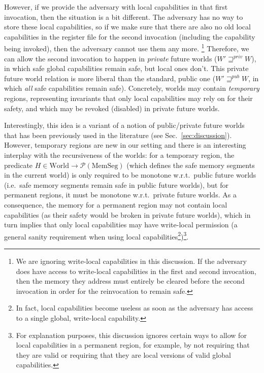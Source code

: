 \documentclass{llncs}
\newcommand{\sectionname}{Sec.}
\newcommand{\powerset}[1]{\mathcal{P}(#1)}
\newcommand{\var}[1]{\mathit{#1}}
\newcommand{\futurewk}{\mathbin{\sqsupseteq}^{\var{pub}}}
\newcommand{\futurestr}{\mathbin{\sqsupseteq}^{\var{priv}}}
\newcommand{\plaindom}[1]{\mathrm{#1}}
\newcommand{\HeapSegments}{\plaindom{MemSeg}}
\newcommand{\MemSegments}{\HeapSegments}
\newcommand{\Worlds}{\plaindom{World}}
\begin{document}
However, if we provide the adversary with local capabilities in that first
invocation, then the situation is a bit different. The adversary has no way to
store these local capabilities, so if we make sure that there are also no old
local capabilities in the register file for the second invocation (including the
capability being invoked), then the adversary cannot use them any more.%
\footnote{We are ignoring write-local capabilities in this discussion. If the
  adversary does have access to write-local capabilities in the first and second
  invocation, then the memory they address must entirely be cleared before the
  second invocation in order for the reinvocation to remain safe.} Therefore, we
can allow the second invocation to happen in \emph{private} future worlds ($W'
\futurestr W$), in which safe global capabilities remain safe, but local ones
don't. This private future world relation is more liberal than the standard,
public one ($W' \futurewk W$, in which \emph{all} safe capabilities remain
safe). Concretely, worlds may contain \emph{temporary} regions, representing
invariants that only local capabilities may rely on for their safety, and which
may be revoked (disabled) in private future worlds.

Interestingly, this idea is a variant of a notion of public/private future
worlds that has been previously used in the literature (see
\sectionname~\ref{sec:discussion}). However, temporary regions are new in our setting
and there is an interesting interplay with the recursiveness of the worlds: for
a temporary region, the predicate $H \in \Worlds \rightarrow
\powerset{\MemSegments}$ (which defines the safe memory segments in the
current world) is only required to be monotone w.r.t.\ public
future worlds (i.e.\ safe memory segments remain safe in public future worlds),
but for permanent regions, it must be monotone w.r.t.\ private future worlds.
As a consequence, the memory for a permanent region may not contain local
capabilities (as their safety would be broken in private future worlds), which
in turn implies that only local capabilities may have write-local permission (a
general sanity requirement when using local capabilities\footnote{In fact, local
  capabilities become useless as soon as the adversary has access to a single
  global, write-local capability.})\footnote{For explanation purposes, this
  discussion ignores certain ways to allow for local capabilities in a permanent
  region, for example, by not requiring that they are valid or requiring that
  they are local versions of valid global capabilities.}.
\end{document}
